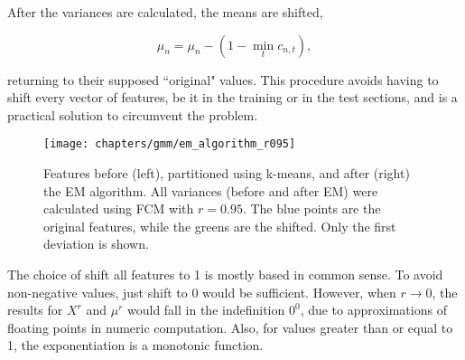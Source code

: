 \noindent After the variances are calculated, the means are shifted,

\begin{equation}
    \mu_n = \mu_n - (1 - \min_t c_{n,t}),
    \label{eq:means-shift-down}
\end{equation}

\noindent returning to their supposed ``original" values. This procedure avoids having to shift every vector of features, be it in the training or in the test sections, and is a practical solution to circumvent the problem.

\begin{figure}[ht]
    \centering
    \texttt{[image: chapters/gmm/em\_algorithm\_r095]}
    \caption{Features before (left), partitioned using k-means, and after (right) the EM algorithm. All variances (before and after EM) were calculated using FCM with $r = 0.95$. The blue points are the original features, while the greens are the shifted. Only the first deviation is shown.}
    \label{fig:frac-em_algorithm}
\end{figure}

The choice of shift all features to 1 is mostly based in common sense. To avoid non-negative values, just shift to 0 would be sufficient. However, when $r \to 0$, the results for $X^r$ and $\mu^r$ would fall in the indefinition $0^0$, due to approximations of floating points in numeric computation. Also, for values greater than or equal to 1, the exponentiation is a monotonic function.